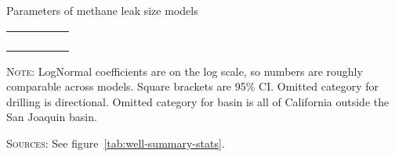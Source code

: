 \begin{threeparttable}

\caption{Parameters of methane leak size models}

\label{tab:param-leak-size}
\begin{tabularx}{\textwidth}{l d d d d}
\toprule
&  &  &  &  \\
&  &  &&  \\
\midrule
\\
\midrule
\\
\bottomrule
\end{tabularx}
\begin{tablenotes}
\item \textsc{Note:}
LogNormal coefficients are on the log scale, so numbers are roughly comparable across models.
Square brackets are 95\% CI.
Omitted category for drilling is directional.
Omitted category for basin is all of California outside the San Joaquin basin.

\textsc{Sources:} See figure~\ref{tab:well-summary-stats}.
\end{tablenotes}
\end{threeparttable}
